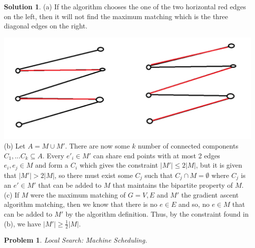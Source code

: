 \documentclass{article}
\newtheorem{problem}{Problem}
\theoremstyle{definition}
\newtheorem*{solution}{Solution}
\begin{document}
\begin{solution}

(a)  If the algorithm chooses the one of the two horizontal red edges on the left, then it will not find the maximum matching which is the three diagonal edges on the right.

\includegraphics[scale=0.3]{a3q2a} \\

(b) Let \(A=M\cup M'\). There are now some \(k\) number of connected components \(C_1,...C_k\subseteq A\). Every \(e'_i\in M'\) can share end points with at most 2 edges \(e_i, e_j \in M\) and form a \(C_i\) which gives the constraint \(|M'|\leq 2|M|\), but it is given that \(|M'|>2|M|\), so there must exist some \(C_j\) such that \(C_j\cap M=\emptyset\) where \(C_j\) is an \(e'\in M'\) that can be added to \(M\) that maintains the bipartite property of \(M\). \\

(c) If \(M\) were the maximum matching of \(G={V,E}\) and \(M'\) the gradient ascent algorithm matching, then we know that there is no \(e\in E\) and so, no \(e\in M\) that can be added to \(M'\) by the algorithm definition. Thus, by the constraint found in (b), we have \(|M'|\geq \frac{1}{2}|M|\).

\end{solution}

\begin{problem} 

Local Search: Machine Scheduling.

\end{problem}
\end{document}
